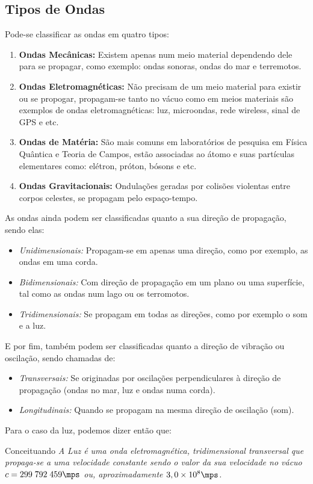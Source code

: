 \subsection*{Tipos de Ondas}
Pode-se classificar as ondas em quatro tipos:
\begin{enumerate}
    \item \textbf{Ondas Mecânicas:} Existem apenas num meio material dependendo dele para se propagar, como exemplo: ondas sonoras, ondas do mar e terremotos.  
    \item \textbf{Ondas Eletromagnéticas:} Não precisam de um meio material para existir ou se propogar, propagam-se tanto no vácuo como em meios materiais são exemplos de ondas eletromagnéticas: luz, microondas, rede wireless, sinal de GPS e etc.
    \item \textbf{Ondas de Matéria:} São mais comuns em laboratórios de pesquisa em Física Quântica e Teoria de Campos, estão associadas ao átomo e suas partículas elementares como: elétron, próton, bósons e etc.
    \item \textbf{Ondas Gravitacionais:} Ondulações geradas por colisões violentas entre corpos celestes, se propagam pelo espaço-tempo.
\end{enumerate}
As ondas ainda podem ser classificadas quanto a sua direção de propagação, sendo elas:
\begin{itemize}
    \item \emph{Unidimensionais:} Propagam-se em apenas uma direção, como por exemplo, as ondas em uma corda.
    \item \emph{Bidimensionais:} Com direção de propagação em um plano ou uma superfície, tal como as ondas num lago ou os terromotos.
    \item \emph{Tridimensionais:} Se propagam em todas as direções, como por exemplo o som e a luz. 
\end{itemize}
E por fim, também podem ser classificadas quanto a direção de vibração ou oscilação, sendo chamadas de:
\begin{itemize}
    \item \emph{Transversais:} Se originadas por oscilações perpendiculares à direção de propagação (ondas no mar, luz e ondas numa corda).
    \item \emph{Longitudinais:} Quando se propagam na mesma direção de oscilação (som).
\end{itemize}
Para o caso da luz, podemos dizer então que:
\begin{mybox}[colback=white, colframe=amarelo,colbacktitle=amarelo!85!amarelo,]{Conceituando}
    \emph{A Luz é uma onda eletromagnética, tridimensional transversal que propaga-se a uma velocidade constante sendo o valor da sua velocidade no vácuo $c=299\;792\;459\mps$ ou, aproximadamente $3,0\times 10^{8}\mps$.}
\end{mybox}


